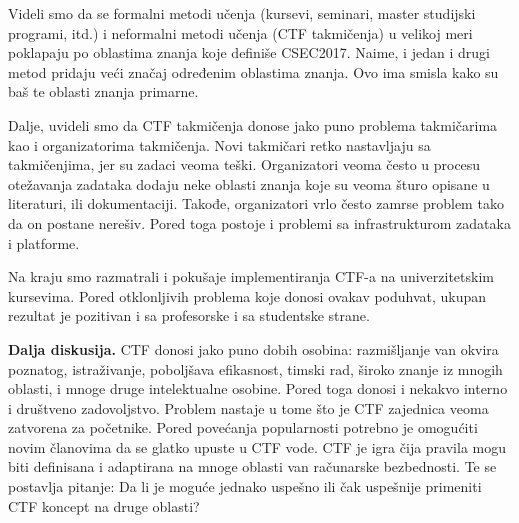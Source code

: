 \documentclass[12pt, a4paper, twocolumn]{article}
\begin{document}
Videli smo da se formalni metodi učenja (kursevi, seminari, master 
studijski programi, itd.) i neformalni metodi učenja (CTF takmičenja) 
u velikoj meri poklapaju po oblastima znanja koje definiše CSEC2017. 
Naime, i jedan i drugi metod pridaju veći značaj određenim oblastima
znanja. Ovo ima smisla kako su baš te oblasti znanja primarne.

Dalje, uvideli smo da CTF takmičenja donose jako puno problema 
takmičarima kao i organizatorima takmičenja. Novi takmičari retko 
nastavljaju sa takmičenjima, jer su zadaci veoma teški. Organizatori 
veoma često u procesu otežavanja zadataka dodaju neke oblasti znanja 
koje su veoma šturo opisane u literaturi, ili dokumentaciji. Takođe, 
organizatori vrlo često zamrse problem tako da on postane nerešiv. 
Pored toga postoje i problemi sa infrastrukturom zadataka i platforme.

Na kraju smo razmatrali i pokušaje implementiranja CTF-a na 
univerzitetskim kursevima. Pored otklonljivih problema koje donosi 
ovakav poduhvat, ukupan rezultat je pozitivan i sa profesorske i sa 
studentske strane. 

\textbf{Dalja diskusija.} CTF donosi jako puno dobih osobina: razmišljanje 
van okvira poznatog, istraživanje, poboljšava efikasnost, timski rad, široko 
znanje iz mnogih oblasti, i mnoge druge intelektualne osobine. Pored toga 
donosi i nekakvo interno i društveno zadovoljstvo. Problem nastaje u tome što 
je CTF zajednica veoma zatvorena za početnike. Pored povećanja popularnosti 
potrebno je omogućiti novim članovima da se glatko upuste u CTF vode. CTF je 
igra čija pravila mogu biti definisana i adaptirana na mnoge oblasti van 
računarske bezbednosti. Te se postavlja pitanje: Da li je moguće jednako 
uspešno ili čak uspešnije primeniti CTF koncept na druge oblasti?

\nocite{*}

\printbibliography
\end{document}
